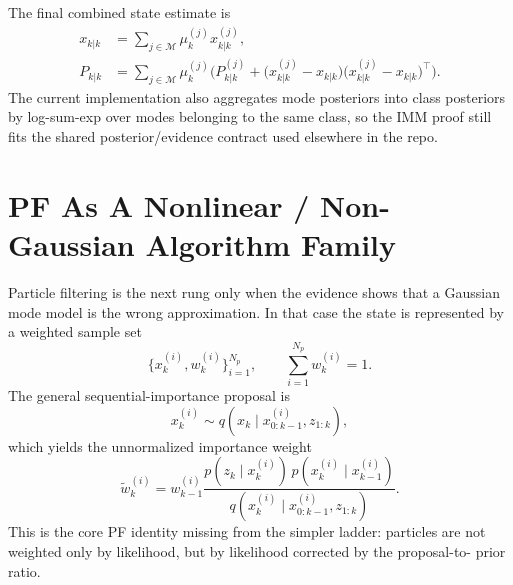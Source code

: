 \documentclass[11pt]{article}
\begin{document}
The final combined state estimate is
\begin{align}
x_{k|k}
&=
\sum_{j \in \mathcal{M}} \mu_k^{(j)} x_{k|k}^{(j)},
\\
P_{k|k}
&=
\sum_{j \in \mathcal{M}} \mu_k^{(j)}
\Big(
P_{k|k}^{(j)}
+
\big(x_{k|k}^{(j)}-x_{k|k}\big)\big(x_{k|k}^{(j)}-x_{k|k}\big)^\top
\Big).
\end{align}
The current implementation also aggregates mode posteriors into class
posteriors by log-sum-exp over modes belonging to the same class, so the IMM
proof still fits the shared posterior/evidence contract used elsewhere in the
repo.

\section{PF As A Nonlinear / Non-Gaussian Algorithm Family}

Particle filtering is the next rung only when the evidence shows that a
Gaussian mode model is the wrong approximation. In that case the state is
represented by a weighted sample set
\begin{equation}
    \{x_k^{(i)}, w_k^{(i)}\}_{i=1}^{N_p},
    \qquad
    \sum_{i=1}^{N_p} w_k^{(i)} = 1.
\end{equation}
The general sequential-importance proposal is
\begin{equation}
    x_k^{(i)} \sim q(x_k \mid x_{0:k-1}^{(i)}, z_{1:k}),
\end{equation}
which yields the unnormalized importance weight
\begin{equation}
    \tilde{w}_k^{(i)}
    =
    w_{k-1}^{(i)}
    \frac{
        p(z_k \mid x_k^{(i)})\,p(x_k^{(i)} \mid x_{k-1}^{(i)})
    }{
        q(x_k^{(i)} \mid x_{0:k-1}^{(i)}, z_{1:k})
    }.
\end{equation}
This is the core PF identity missing from the simpler ladder: particles are not
weighted only by likelihood, but by likelihood corrected by the proposal-to-
prior ratio.
\end{document}
